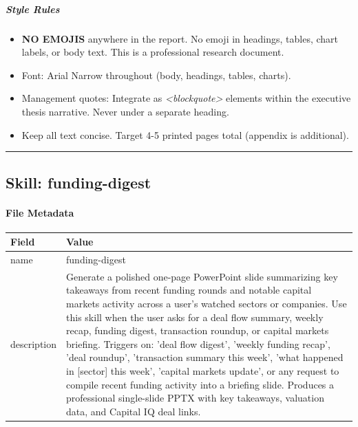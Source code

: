 \documentclass[11pt]{article}
\begin{document}
\subparagraph{Style Rules}\mbox{}\par
\begin{itemize}[leftmargin=*,itemsep=2pt,topsep=2pt]
\item {} \textbf{NO EMOJIS} anywhere in the report. No emoji in headings, tables, chart labels, or body text. This is a professional research document.
\item {} Font: Arial Narrow throughout (body, headings, tables, charts).
\item {} Management quotes: Integrate as \emph{<blockquote>} elements within the executive thesis narrative. Never under a separate heading.
\item {} Keep all text concise. Target 4-5 printed pages total (appendix is additional).
\end{itemize}

\vspace{0.8em}\hrule\vspace{0.8em}

\subsection{Skill: funding-digest}\label{file:spglobal-skills-funding-digest-SKILL.md}

\paragraph{File Metadata}\mbox{}\par
\begingroup
\small
\setlength{\tabcolsep}{2pt}
\begin{longtable}{>{\RaggedRight\arraybackslash\hspace{0pt}}p{}>{\RaggedRight\arraybackslash\hspace{0pt}}p{}}
\toprule
{} \textbf{Field} & \textbf{Value} \\
\midrule
{} name & funding-digest \\
{} description & Generate a polished one-page PowerPoint slide summarizing key takeaways from recent funding rounds and notable capital markets activity across a user's watched sectors or companies. Use this skill when the user asks for a deal flow summary, weekly recap, funding digest, transaction roundup, or capital markets briefing. Triggers on: 'deal flow digest', 'weekly funding recap', 'deal roundup', 'transaction summary this week', 'what happened in [sector] this week', 'capital markets update', or any request to compile recent funding activity into a briefing slide. Produces a professional single-slide PPTX with key takeaways, valuation data, and Capital IQ deal links. \\
\bottomrule
\end{longtable}
\endgroup
\end{document}
